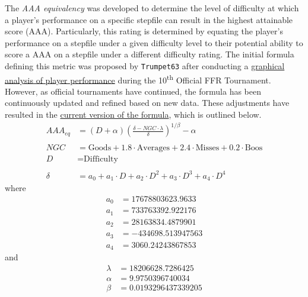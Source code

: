 The \textit{AAA equivalency} was developed to determine the level of difficulty at which a player's performance on a specific stepfile can result in the highest attainable score (AAA). Particularly, this rating is determined by equating the player's performance on a stepfile under a given difficulty level to their potential ability to score a AAA on a stepfile under a different difficulty rating. The initial formula defining this metric was proposed by \texttt{Trumpet63} after conducting a \href{https://www.flashflashrevolution.com/vbz/showthread.php?p=4209451}{graphical analysis of player performance} during the 10\textsuperscript{th} Official FFR Tournament. However, as official tournaments have continued, the formula has been continuously updated and refined based on new data. These adjustments have resulted in the \href{https://www.flashflashrevolution.com/ffr/new-skill-based-ranking-system-leaderboards/}{current version of the formula}, which is outlined below.
\begin{align*}
	AAA_{eq} & = (D + \alpha) \left( \frac{\delta - NGC \cdot \lambda}{\delta}\right)^{1 / \beta} - \alpha  \\
	\\
	NGC      & = \text{Goods} + 1.8 \cdot \text{Averages} + 2.4 \cdot \text{Misses} + 0.2 \cdot \text{Boos} \\
	D        & = \text{Difficulty}                                                                          \\
	\\
	\delta   & = a_0 + a_1 \cdot D + a_2 \cdot D^2 + a_3 \cdot D^3 + a_4 \cdot D^4
\end{align*}
where
\begin{align*}
	a_0      & = 17678803623.9633                                                                           \\
	a_1      & = 733763392.922176                                                                           \\
	a_2      & = 28163834.4879901                                                                           \\
	a_3      & = -434698.513947563                                                                          \\
	a_4      & = 3060.24243867853
\end{align*}
and
\begin{align*}
	\lambda  & = 18206628.7286425                                                                           \\
	\alpha   & = 9.9750396740034                                                                            \\
	\beta    & = 0.0193296437339205                                                                         
\end{align*}


